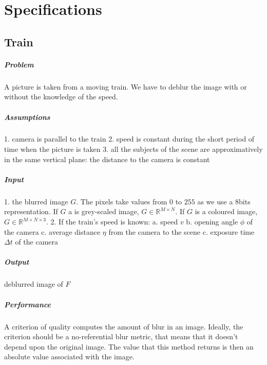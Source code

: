 \chapter{Specifications}

\section{Train}

\paragraph{Problem}
A picture is taken from a moving train. We have to deblur the image with or without the knowledge of the speed.

\paragraph{Assumptions}
1. camera is parallel to the train 2. speed is constant during the short period of time when the picture is taken 3. all the subjects of the scene are approximatively in the same vertical plane: the distance to the camera is constant

\paragraph{Input}
1. the blurred image $G$. The pixels take values from $0$ to $255$ as we use a 8bits representation. If $G$ a is grey-scaled image, $G \in \mathbb{R}^{M \times N}$. If $G$ is a coloured image, $G \in \mathbb{R}^{M \times N \times 3}$. 2. If the train's speed is known: a. speed $v$ b. opening angle $\phi$ of the camera c. average distance $\eta$ from the camera to the scene c. exposure time $\Delta t$ of the camera 

\paragraph{Output}
deblurred image of $F$

\paragraph{Performance}
A criterion of quality computes the amount of blur in an image. Ideally, the criterion should be a no-referential blur metric, that means that it doesn't depend upon the original image. The value that this method returns is then an absolute value associated with the image.

